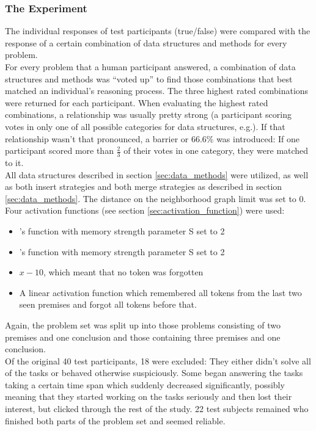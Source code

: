 \documentclass[hidelinks]{scrartcl}
\begin{document}
\subsubsection{The Experiment}
The individual responses of test participants (true/false) were compared with the response of a certain combination of data structures and methods for every problem. \\
For every problem that a human participant answered, a combination of data structures and methods was ``voted up'' to find those combinations that best matched an individual's reasoning process. The three highest rated combinations were returned for each participant. When evaluating the highest rated combinations, a relationship was usually pretty strong (a participant scoring votes in only one of all possible categories for data structures, e.g.). If that relationship wasn't that pronounced, a barrier or 66.6\% was introduced: If one participant scored more than $\frac{2}{3}$ of their votes in one category, they were matched to it. \\
All data structures described in section \ref{sec:data_methods} were utilized, as well as both insert strategies and both merge strategies as described in section \ref{sec:data_methods}. The distance on the neighborhood graph limit was set to 0. Four activation functions (see section \ref{sec:activation_function}) were used:
\begin{itemize}
	\item \cite{Yffelti.2016}'s function with memory strength parameter S set to 2
	\item \cite{Yffelti.2016}'s function with memory strength parameter S set to 2
	\item $x - 10$, which meant that no \gls{token} was forgotten
	\item A linear activation function which remembered all \gls{token}s from the last two seen \gls{premise}s and forgot all \gls{token}s before that.
\end{itemize}
Again, the problem set was split up into those problems consisting of two premises and one conclusion and those containing three premises and one conclusion. \\
Of the original 40 test participants, 18 were excluded: They either didn't solve all of the tasks or behaved otherwise suspiciously. Some began answering the tasks taking a certain time span which suddenly decreased significantly, possibly meaning that they started working on the tasks seriously and then lost their interest, but clicked through the rest of the study. 22 test subjects remained who finished both parts of the problem set and seemed reliable.
\end{document}
